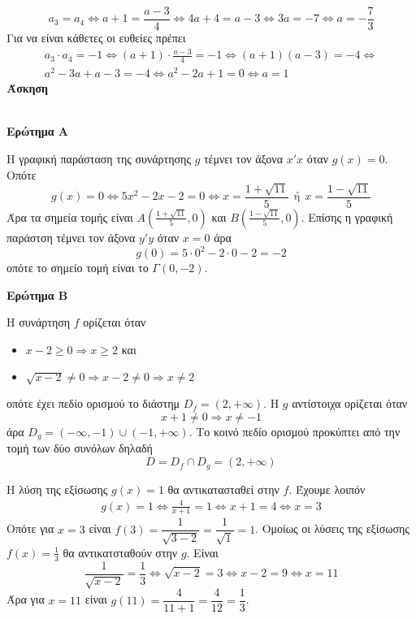 \documentclass[11pt,a4paper]{article}
\newcommand{\kerkissans}[1]{{\fontfamily{maksf}\selectfont \textbf{#1}}}
\newcounter{askhsh}
\newcommand{\askhsh}{\kerkissans{\large Άσκηση \theaskhsh}\ \addtocounter{askhsh}{1}}
\begin{document}
\[ a_3=a_4\Leftrightarrow a+1=\frac{a-3}{4}\Leftrightarrow 4a+4=a-3\Leftrightarrow 3a=-7\Leftrightarrow a=-\frac{7}{3} \]
Για να είναι κάθετες οι ευθείες πρέπει
\begin{gather*}
a_3\cdot a_4=-1\Leftrightarrow (a+1)\cdot\frac{a-3}{4}=-1\Leftrightarrow (a+1)(a-3)=-4\Leftrightarrow\\
a^2-3a+a-3=-4\Leftrightarrow a^2-2a+1=0\Leftrightarrow a=1
\end{gather*}
\askhsh\\
\textbf{Ερώτημα Α}
\begin{rlist}
\item Η γραφική παράσταση της συνάρτησης $g$ τέμνει τον άξονα $x'x$ όταν $g(x)=0$. Οπότε
\[ g(x)=0\Leftrightarrow 5x^2-2x-2=0\Leftrightarrow x=\frac{1+\sqrt{11}}{5}\ \ \text{ή}\ \ x=\frac{1-\sqrt{11}}{5} \]
Άρα τα σημεία τομής είναι $A\left(\frac{1+\sqrt{11}}{5},0\right)$ και $B\left(\frac{1-\sqrt{11}}{5},0\right)$. Επίσης η γραφική παράστση τέμνει τον άξονα $y'y$ όταν $x=0$ άρα
\[ g(0)=5\cdot 0^2-2\cdot 0-2=-2 \]
οπότε το σημείο τομή είναι το $\varGamma(0,-2)$.
\item 
\end{rlist}
\textbf{Ερώτημα Β}
\begin{rlist}
\item Η συνάρτηση $f$ ορίζεται όταν 
\begin{itemize}
\item $x-2\geq 0\Rightarrow x\geq 2$ και 
\item $\sqrt{x-2}\neq 0\Rightarrow x-2\neq 0\Rightarrow x\neq 2$
\end{itemize}
οπότε έχει πεδίο ορισμού το διάστημ $D_f=(2,+\infty)$. Η $g$ αντίστοιχα ορίζεται όταν 
\[x+1\neq 0\Rightarrow x\neq -1\]
άρα $D_g=(-\infty,-1)\cup(-1,+\infty)$. Το κοινό πεδίο ορισμού προκύπτει από την τομή των δύο συνόλων δηλαδή
\[ D=D_f\cap D_g=(2,+\infty) \]
\item Η λύση της εξίσωσης $g(x)=1$ θα αντικατασταθεί στην $f$. Έχουμε λοιπόν
\begin{gather*}
g(x)=1\Leftrightarrow \frac{4}{x+1}=1\Leftrightarrow x+1=4\Leftrightarrow x=3
\end{gather*}
Οπότε για $x=3$ είναι $f(3)=\dfrac{1}{\sqrt{3-2}}=\dfrac{1}{\sqrt{1}}=1$. Ομοίως οι λύσεις της εξίσωσης $f(x)=\frac{1}{3}$ θα αντικατσταθούν στην $g$. Είναι
\[ \frac{1}{\sqrt{x-2}}=\frac{1}{3}\Leftrightarrow \sqrt{x-2}=3\Leftrightarrow x-2=9\Leftrightarrow x=11 \]
Άρα για $x=11$ είναι $g(11)=\dfrac{4}{11+1}=\dfrac{4}{12}=\dfrac{1}{3}$.
\end{rlist}
\end{document}
